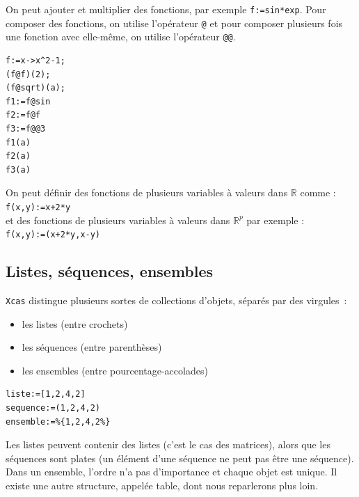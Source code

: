\documentclass{article}
\begin{document}
On peut ajouter et multiplier des fonctions,
par exemple \verb|f:=sin*exp|. Pour composer des fonctions, on utilise 
l'op\'erateur \verb|@| et pour composer plusieurs fois une fonction 
avec elle-m\^eme, on utilise l'op\'erateur \verb|@@|.
\begin{verbatim}
f:=x->x^2-1;
(f@f)(2);
(f@sqrt)(a);
f1:=f@sin
f2:=f@f
f3:=f@@3
f1(a)
f2(a)
f3(a)
\end{verbatim} 
%
On peut d\'efinir des fonctions de plusieurs variables \`a valeurs dans 
$\mathbb R$ comme :\\
\verb|f(x,y):=x+2*y| \\
et des fonctions de plusieurs variables \`a valeurs dans $\mathbb R^p$
par exemple :\\
\verb|f(x,y):=(x+2*y,x-y)| 

%
\subsection{Listes, s\'equences, ensembles}
%
{\tt Xcas} distingue plusieurs sortes de collections d'objets, 
s\'epar\'es par des virgules~: 
\begin{itemize}
\item les listes (entre crochets)
\item  les s\'equences (entre parenth\`eses) 
\item  les ensembles (entre pourcentage-accolades)
\end{itemize}
\begin{verbatim}
liste:=[1,2,4,2]
sequence:=(1,2,4,2)
ensemble:=%{1,2,4,2%}
\end{verbatim}
Les listes peuvent contenir des listes (c'est le cas des matrices), 
alors que les s\'equences sont plates (un \'el\'ement d'une s\'equence
ne peut pas \^etre une s\'equence). Dans un ensemble,
l'ordre n'a pas d'importance et chaque objet est unique. 
Il existe une autre structure, appel\'ee table, dont nous
reparlerons plus loin.
\end{document}

